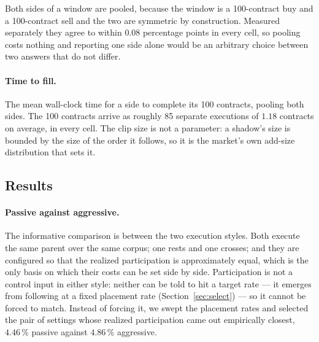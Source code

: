 \documentclass[11pt]{article}
\begin{document}
Both sides of a window are pooled, because the window is a 100-contract buy and
a 100-contract sell and the two are symmetric by construction. Measured
separately they agree to within $0.08$ percentage points in every cell, so
pooling costs nothing and reporting one side alone would be an arbitrary choice
between two answers that do not differ.

\paragraph{Time to fill.} The mean wall-clock time for a side to complete its
100 contracts, pooling both sides. The 100 contracts arrive as roughly 85
separate executions of $1.18$ contracts on average, in every cell. The clip
size is not a parameter: a shadow's size is bounded by the size of
the order it follows, so it is the market's own add-size distribution that sets
it.

\subsection{Results}
\label{sec:eval:results}

\paragraph{Passive against aggressive.}
The informative comparison is between the two execution styles. Both execute the
same parent over the same corpus; one rests and one crosses; and they are
configured so that the realized participation is approximately equal, which is
the only basis on which their costs can be set side by side. Participation is not
a control input in either style: neither can be told to hit a target rate --- it
emerges from following at a fixed placement rate (Section~\ref{sec:select}) ---
so it cannot be forced to match. Instead of forcing it, we swept the placement
rates and selected the pair of settings whose realized participation came out
empirically closest, $4.46\,\%$ passive against $4.86\,\%$ aggressive.
\end{document}
